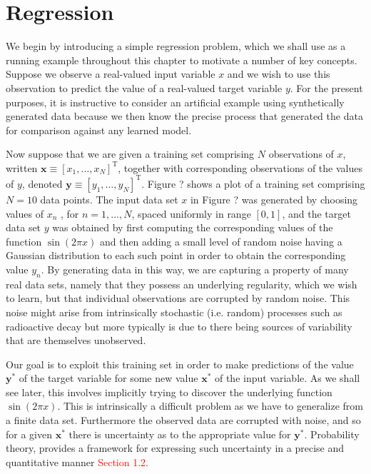 \documentclass{article} %
\begin{document}
\section{Regression}

We begin by introducing a simple regression problem, which we shall use as a running example throughout this chapter to motivate a number of key concepts. Suppose we observe a real-valued input variable $x$ and we wish to use this observation to predict the value of a real-valued target variable $y$. For the present purposes, it is instructive to consider an artificial example using synthetically generated data because we then know the precise process that generated the data for comparison against any learned model.

Now suppose that we are given a training set comprising $N$ observations of $x$, written $\mathbf{x} \equiv \left[ x_{1}, \dots, x_{N} \right]^{\mathrm{T}}$, together with corresponding observations of the values of $y$, denoted $\mathbf{y} \equiv\left[ y_{1}, \dots, y_{N} \right]^{\mathrm{T}}$. Figure ? shows a plot of a training set comprising $N = 10$ data points. The input data set $x$ in Figure ? was generated by choosing values of $x_n$ , for $n = 1, . . . , N$, spaced uniformly in range $[0, 1]$, and the target data set $y$ was obtained by first computing the corresponding values of the function $\sin(2\pi x)$ and then adding a small level of random noise having a Gaussian distribution to each such point in order to obtain the corresponding value $y_n$. By generating data in this way, we are capturing a property of many real data sets, namely that they possess an underlying regularity, which we wish to learn, but that individual observations are corrupted by random noise. This noise might arise from intrinsically stochastic (i.e. random) processes such as radioactive decay but more typically is due to there being sources of variability that are themselves unobserved.

Our goal is to exploit this training set in order to make predictions of the value $\mathbf{y}^*$ of the target variable for some new value $\mathbf{x}^*$ of the input variable. As we shall see later, this involves implicitly trying to discover the underlying function $\sin(2\pi x)$. This is intrinsically a difficult problem as we have to generalize from a finite data set. Furthermore the observed data are corrupted with noise, and so for a given $\mathbf{x}^*$ there is uncertainty as to the appropriate value for $\mathbf{y}^*$. Probability theory, provides a framework for expressing such uncertainty in a precise and quantitative manner \textcolor{red}{Section 1.2}.
\end{document}
